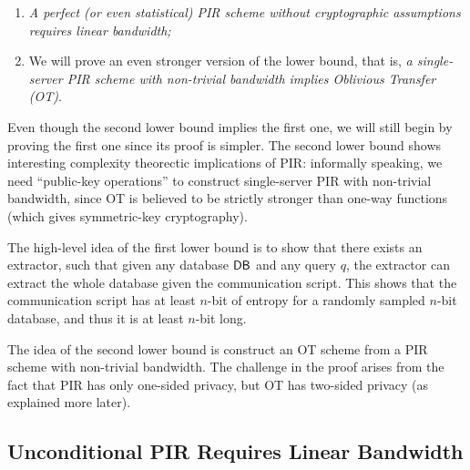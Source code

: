 \begin{enumerate}
    \item \textit{A perfect (or even statistical) PIR scheme without cryptographic assumptions requires linear bandwidth;}
    \item We will prove an even stronger version of the lower bound, that is, 
\textit{a single-server PIR scheme with non-trivial bandwidth implies Oblivious Transfer (OT)}.
\end{enumerate}

Even though the second lower bound implies the first one,
we will still begin by proving the first one since its proof is simpler. 
The second lower bound shows interesting 
complexity theorectic implications of PIR: informally speaking,
we need ``public-key operations'' to construct single-server PIR with 
non-trivial bandwidth, since OT is believed to be strictly stronger
than one-way functions (which gives symmetric-key cryptography).

The high-level idea of the first lower bound is to show that there exists an extractor, such that given any database ${\sf DB}$ and any query $q$, the extractor can extract the whole database given the communication script.
This shows that the communication script has at least $n$-bit of entropy for a  
randomly sampled $n$-bit database, 
and thus it is at least $n$-bit long. 

The idea of the second lower bound is construct an OT  
scheme from a PIR scheme 
with non-trivial bandwidth.
The challenge in the proof arises from the fact that PIR has only one-sided
privacy, but OT has two-sided privacy (as explained more later).







\subsection{Unconditional PIR Requires Linear Bandwidth}

